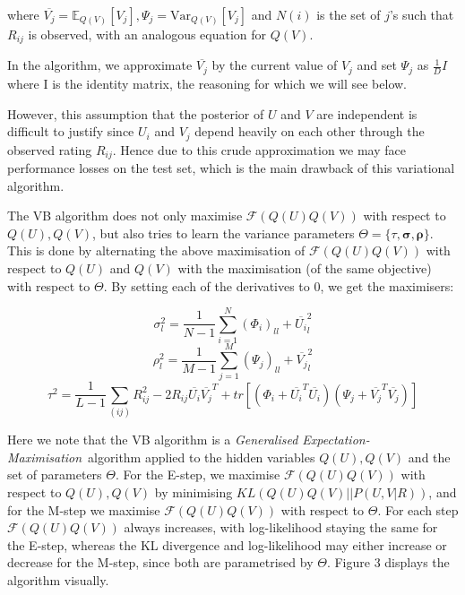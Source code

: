 \documentclass{article}
\theoremstyle{plain}
\begin{document}
where $\overline{V_j}=\mathbb{E}_{Q(V)}[V_j], \Psi_j=\mathrm{Var}_{Q(V)}[V_j]$ and $N(i)$ is the set of $j$'s such that $R_{ij}$ is observed, with an analogous equation for $Q(V)$.

In the algorithm, we approximate $\overline{V_j}$ by the current value of $V_j$ and set $\Psi_j$ as $\frac{1}{D}I$ where I is the identity matrix, the reasoning for which we will see below.

However, this assumption that the posterior of $U$ and $V$ are independent is difficult to justify since $U_i$ and $V_j$ depend heavily on each other through the observed rating $R_{ij}$. Hence due to this crude approximation we may face performance losses on the test set, which is the main drawback of this variational algorithm.

The VB algorithm does not only maximise $\mathcal{F}(Q(U)Q(V))$ with respect to $Q(U),Q(V)$, but also tries to learn the variance parameters $\Theta=\{\tau,\mathbf{\sigma},\mathbf{\rho} \}$. This is done by alternating the above maximisation of $\mathcal{F}(Q(U)Q(V))$ with respect to $Q(U)$ and $Q(V)$ with the maximisation (of the same objective) with respect to $\Theta$. By setting each of the derivatives to 0, we get the maximisers:

\begin{equation}
\sigma_l^2=\frac{1}{N-1}\sum_{i=1}^N (\Phi_i)_{ll}+\overline{U_i}_l^2 
\end{equation}
\begin{equation}
\rho_l^2=\frac{1}{M-1}\sum_{j=1}^M (\Psi_j)_{ll}+\overline{V_j}_l^2
\end{equation}
\begin{equation}
\tau^2=\frac{1}{L-1}\sum_{(ij)} R_{ij}^2-2R_{ij}\overline{U_i}\overline{V_j}^T+tr[(\Phi_i+\overline{U_i}^T\overline{U_i})(\Psi_j+\overline{V_j}^T\overline{V_j})]
\end{equation}

Here we note that the VB algorithm is a \textit{Generalised Expectation-Maximisation}\ algorithm applied to the hidden variables $Q(U),Q(V)$ and the set of parameters $\Theta$. For the E-step, we maximise $\mathcal{F}(Q(U)Q(V))$ with respect to $Q(U),Q(V)$ by minimising $KL(Q(U)Q(V)||P(U,V|R))$, and for the M-step we maximise $\mathcal{F}(Q(U)Q(V))$ with respect to $\Theta$. For each step $\mathcal{F}(Q(U)Q(V))$ always increases, with log-likelihood staying the same for the E-step, whereas the KL divergence and log-likelihood may either increase or decrease for the M-step, since both are parametrised by $\Theta$. Figure 3 displays the algorithm visually.
\end{document}
